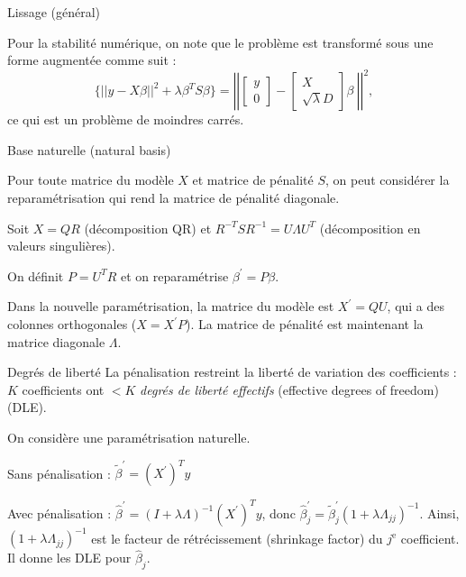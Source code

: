 \documentclass{BeamerTemplate}
\begin{document}
\begin{refsection}
\begin{frame}{Lissage (général)}
\end{frame}

\begin{frame}{}
Pour la stabilité numérique, on note que le problème est transformé sous une forme augmentée comme suit :
 $$\{  ||y - X \beta ||^2 + \lambda  \beta^T S \beta \} = \left|\left| \left[
 \begin{array}{c}
y \\
0
\end{array}
 \right] - \left[
 \begin{array}{c}
 X  \\
 \sqrt{\lambda} D
  \end{array}
 \right] \beta \ 
  \right|\right|^2,$$
ce qui est un problème de moindres carrés.
\end{frame}


\begin{frame}{Base naturelle (natural basis)}

Pour toute matrice du modèle $X$ et matrice de pénalité $S$, on peut considérer la reparamétrisation qui rend la matrice de pénalité diagonale.

\bigskip
Soit $X= Q R$ (décomposition QR) et $R^{-T} S R^{-1} = U \Lambda U^{T}$ (décomposition en valeurs singulières).

\bigskip
On définit $P = U^T R$ et on reparamétrise $\beta^{\prime} = P \beta$.

\bigskip 
Dans la nouvelle paramétrisation, la matrice du modèle est $X^{\prime} = Q U$, qui a des colonnes orthogonales ($X = X^{\prime}P$). La matrice de pénalité est maintenant la matrice diagonale $\Lambda$.
\end{frame}


\begin{frame}{Degrés de liberté}
La pénalisation restreint la liberté de variation des coefficients : $K$ coefficients ont $< K$ \textit{degrés de liberté effectifs} (effective degrees of freedom) (DLE).

\bigskip 
On considère une paramétrisation naturelle. 

\bigskip 
Sans pénalisation : $ \tilde{\beta}^{\prime} =  ( X^{\prime} )^T  y$
 
Avec pénalisation : $\hat{\beta}^{\prime} = (I + \lambda \Lambda)^{-1}  ( X^{\prime} )^T
y$, donc $\hat{\beta}_j ^\prime = 
\tilde{\beta}_j^\prime (1 +\lambda \Lambda_{jj})^{-1}$. Ainsi, $(1 + \lambda \Lambda_{jj})^{-1}$ est le facteur de rétrécissement (shrinkage factor) du $j^{\text{e}}$ coefficient. Il donne les DLE pour $\hat{\beta}_j$.


\end{frame}
\end{refsection}
\end{document}

